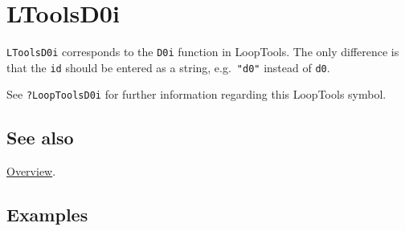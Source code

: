 \documentclass[../FeynHelpersManual.tex]{subfiles}
\begin{document}
\hypertarget{ltoolsd0i}{
\section{LToolsD0i}\label{ltoolsd0i}}

\texttt{LToolsD0i} corresponds to the \texttt{D0i} function in
LoopTools. The only difference is that the \texttt{id} should be entered
as a string, e.g.~\texttt{"d0"} instead of \texttt{d0}.

See \texttt{?LoopTools\textasciigrave D0i} for further information
regarding this LoopTools symbol.

\subsection{See also}

\hyperlink{toc}{Overview}.

\subsection{Examples}
\end{document}

